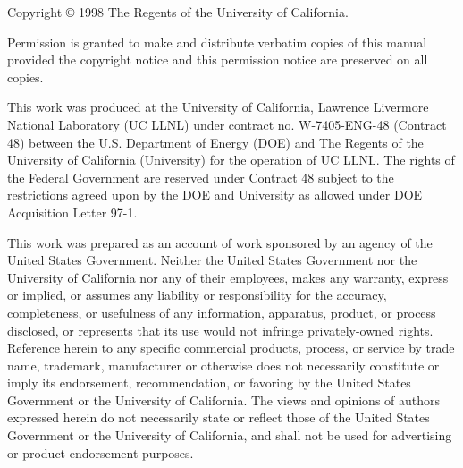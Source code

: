 
\noindent
Copyright \copyright{} 1998 The Regents of the University of California.

\vspace{1em}\noindent
Permission is granted to make and distribute verbatim copies of this
manual provided the copyright notice and this permission notice are
preserved on all copies.

\vspace{1em}\noindent
This work was produced at the University of California, Lawrence
Livermore National Laboratory (UC LLNL) under contract
no. W-7405-ENG-48 (Contract 48) between the U.S. Department of Energy
(DOE) and The Regents of the University of California (University) for
the operation of UC LLNL. The rights of the Federal Government are
reserved under Contract 48 subject to the restrictions agreed upon by
the DOE and University as allowed under DOE Acquisition Letter 97-1.

\vspace{1em}\noindent
This work was prepared as an account of work sponsored by an agency of
the United States Government. Neither the United States Government nor
the University of California nor any of their employees, makes any
warranty, express or implied, or assumes any liability or
responsibility for the accuracy, completeness, or usefulness of any
information, apparatus, product, or process disclosed, or represents
that its use would not infringe privately-owned rights.  Reference
herein to any specific commercial products, process, or service by
trade name, trademark, manufacturer or otherwise does not necessarily
constitute or imply its endorsement, recommendation, or favoring by
the United States Government or the University of California. The
views and opinions of authors expressed herein do not necessarily
state or reflect those of the United States Government or the
University of California, and shall not be used for advertising or
product endorsement purposes.
